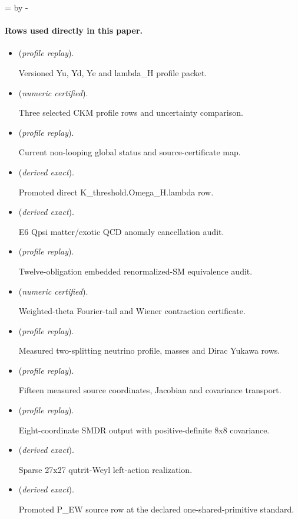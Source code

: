\documentclass[11pt]{article}
\begin{document}
\par\begingroup{}=\pagegoal\advance{} by -\pagetotal\ifdim\dimen0<7\baselineskip\newpage\fi\endgroup
\paragraph{Rows used directly in this paper.}
\begin{itemize}
\setlength{\itemsep}{0.25em}
\item {} (\emph{profile replay}).\par Versioned Yu, Yd, Ye and lambda\_H profile packet.
\item {} (\emph{numeric certified}).\par Three selected CKM profile rows and uncertainty comparison.
\item {} (\emph{profile replay}).\par Current non-looping global status and source-certificate map.
\item {} (\emph{derived exact}).\par Promoted direct K\_threshold.Omega\_H.lambda row.
\item {} (\emph{derived exact}).\par E6 Qpsi matter/exotic QCD anomaly cancellation audit.
\item {} (\emph{profile replay}).\par Twelve-obligation embedded renormalized-SM equivalence audit.
\item {} (\emph{numeric certified}).\par Weighted-theta Fourier-tail and Wiener contraction certificate.
\item {} (\emph{profile replay}).\par Measured two-splitting neutrino profile, masses and Dirac Yukawa rows.
\item {} (\emph{profile replay}).\par Fifteen measured source coordinates, Jacobian and covariance transport.
\item {} (\emph{profile replay}).\par Eight-coordinate SMDR output with positive-definite 8x8 covariance.
\item {} (\emph{derived exact}).\par Sparse 27x27 qutrit-Weyl left-action realization.
\item {} (\emph{derived exact}).\par Promoted P\_EW source row at the declared one-shared-primitive standard.
\end{itemize}
\end{document}
